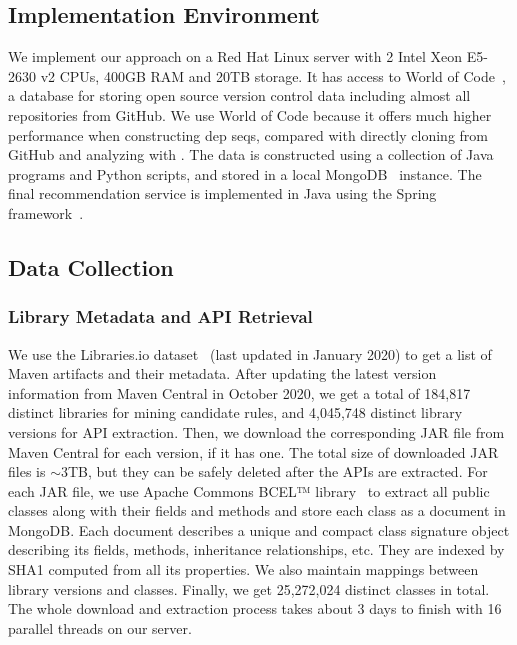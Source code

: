 \documentclass[conference, 10pt]{IEEEtran}
\begin{document}
\subsection{Implementation Environment}

We implement our approach on a Red Hat Linux server with 2 Intel Xeon E5-2630 v2 CPUs, 400GB RAM and 20TB storage.
It has access to World of Code~\cite{2019MSR-Ma-WorldOfCode}, a database for storing open source version control data including almost all repositories from GitHub.
We use World of Code because it offers much higher performance when constructing dep seqs, compared with directly cloning from GitHub and analyzing with .
The data is constructed using a collection of Java programs and Python scripts, and stored in a local MongoDB~\cite{MongoDB} instance. 
The final recommendation service is implemented in Java using the Spring framework~\cite{Spring}.

\subsection{Data Collection}\label{ss:datacollection}

\subsubsection{Library Metadata and API Retrieval}

We use the Libraries.io dataset~\cite{LibrariesIO} (last updated in January 2020) to get a list of Maven artifacts and their metadata. 
After updating the latest version information from Maven Central in October 2020, we get a total of 184,817 distinct libraries for mining candidate rules, and 4,045,748 distinct library versions for API extraction.
Then, we download the corresponding JAR file from Maven Central for each version, if it has one. 
The total size of downloaded JAR files is $\sim$3TB, but they can be safely deleted after the APIs are extracted. 
For each JAR file, we use Apache Commons BCEL™ library~\cite{BCEL} to extract all public classes along with their fields and methods and store each class as a document in MongoDB.
Each document describes a unique and compact class signature object describing its fields, methods, inheritance relationships, etc.
They are indexed by SHA1 computed from all its properties. 
We also maintain mappings between library versions and classes. Finally, we get 25,272,024 distinct classes in total. 
The whole download and extraction process takes about 3 days to finish with 16 parallel threads on our server.
\end{document}

